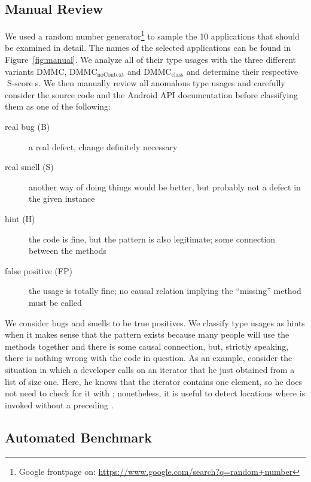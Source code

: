 \subsection{Manual Review}

We used a random number generator\footnote{Google frontpage on: \url{https://www.google.com/search?q=random+number}} to sample the 10 applications that should be examined in detail.
The names of the selected applications can be found in Figure~\ref{fig:manual}.
We analyze all of their type usages with the three different variants $\text{DMMC}$, $\text{DMMC}_{\text{noContext}}$ and $\text{DMMC}_{\text{class}}$ and determine their respective $\operatorname{S-score}$s.
We then manually review all anomalous type usages and carefully consider the source code and the Android API documentation before classifying them as one of the following:
\begin{description}
    \item [real bug (B)] a real defect, change definitely necessary
    \item [real smell (S)] another way of doing things would be better, but probably not a defect in the given instance
    \item [hint (H)] the code is fine, but the pattern is also legitimate; some connection between the methods
    \item [false positive (FP)] the usage is totally fine; no causal relation implying the ``missing'' method must be called
\end{description}

We consider bugs and smells to be true positives.
We classify type usages as hints when it makes sense that the pattern exists because many people will use the methods together and there is some causal connection, but, strictly speaking, there is nothing wrong with the code in question.
As an example, consider the situation in which a developer calls  on an iterator that he just obtained from a list of size one.
Here, he knows that the iterator contains one element, so he does not need to check for it with ; nonetheless, it is useful to detect locations where  is invoked without a preceding .

\subsection{Automated Benchmark}

